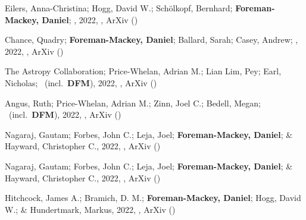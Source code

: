 \item[{\color{numcolor}\scriptsize83}] Eilers, Anna-Christina; Hogg, David W.; Sch{\"o}lkopf, Bernhard; \textbf{Foreman-Mackey, Daniel}; \etal, 2022, , ArXiv ()

\item[{\color{numcolor}\scriptsize82}] Chance, Quadry; \textbf{Foreman-Mackey, Daniel}; Ballard, Sarah; Casey, Andrew; \etal, 2022, , ArXiv ()

\item[{\color{numcolor}\scriptsize81}] The Astropy Collaboration; Price-Whelan, Adrian M.; Lian Lim, Pey; Earl, Nicholas; \etal\ (incl.\ \textbf{DFM}), 2022, , ArXiv ()

\item[{\color{numcolor}\scriptsize80}] Angus, Ruth; Price-Whelan, Adrian M.; Zinn, Joel C.; Bedell, Megan; \etal\ (incl.\ \textbf{DFM}), 2022, , ArXiv ()

\item[{\color{numcolor}\scriptsize79}] Nagaraj, Gautam; Forbes, John C.; Leja, Joel; \textbf{Foreman-Mackey, Daniel}; \& Hayward, Christopher C., 2022, , ArXiv ()

\item[{\color{numcolor}\scriptsize78}] Nagaraj, Gautam; Forbes, John C.; Leja, Joel; \textbf{Foreman-Mackey, Daniel}; \& Hayward, Christopher C., 2022, , ArXiv ()

\item[{\color{numcolor}\scriptsize77}] Hitchcock, James A.; Bramich, D. M.; \textbf{Foreman-Mackey, Daniel}; Hogg, David W.; \& Hundertmark, Markus, 2022, , ArXiv ()


